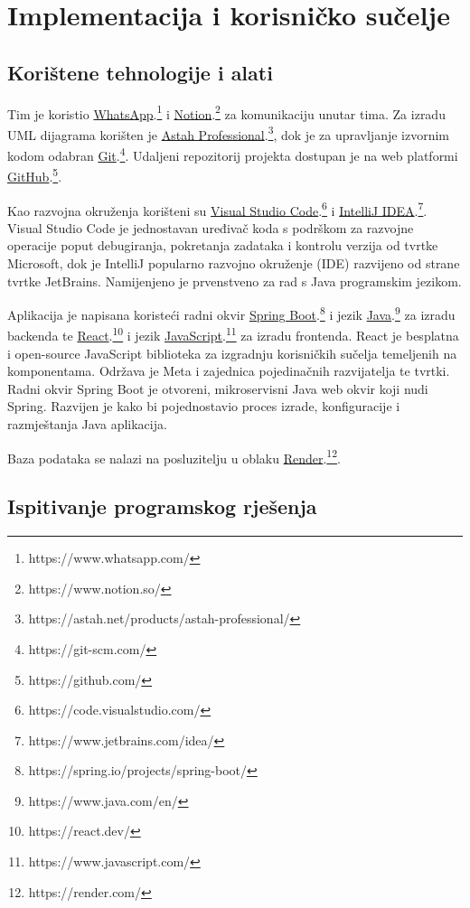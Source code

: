 \chapter{Implementacija i korisničko sučelje}
		
		
		\section{Korištene tehnologije i alati}
		
			Tim je koristio \underline{WhatsApp}.\footnote[1]{https://www.whatsapp.com/} i \underline{Notion}.\footnote[2]{https://www.notion.so/} za komunikaciju unutar tima. Za izradu UML dijagrama korišten je \underline{Astah Professional}.\footnote[3]{https://astah.net/products/astah-professional/}, dok je za upravljanje izvornim kodom odabran \underline{Git}.\footnote[4]{https://git-scm.com/}. Udaljeni repozitorij projekta dostupan je na web platformi \underline{GitHub}.\footnote[5]{https://github.com/}.
			
			Kao razvojna okruženja korišteni su \underline{Visual Studio Code}.\footnote[6]{https://code.visualstudio.com/} i \underline{IntelliJ IDEA}.\footnote[7]{https://www.jetbrains.com/idea/}. Visual Studio Code je jednostavan uređivač koda s podrškom za razvojne operacije poput debugiranja, pokretanja zadataka i kontrolu verzija od tvrtke Microsoft, dok je IntelliJ popularno razvojno okruženje (IDE) razvijeno od strane tvrtke JetBrains. Namijenjeno je prvenstveno za rad s Java programskim jezikom.
			
			Aplikacija je napisana koristeći radni okvir \underline{Spring Boot}.\footnote[8]{https://spring.io/projects/spring-boot/} i jezik \underline{Java}.\footnote[9]{https://www.java.com/en/} za izradu backenda te \underline{React}.\footnote[10]{https://react.dev/} i jezik \underline{JavaScript}.\footnote[11]{https://www.javascript.com/} za izradu frontenda. React je besplatna i open-source JavaScript biblioteka za izgradnju korisničkih sučelja temeljenih na komponentama. Održava je Meta i zajednica pojedinačnih razvijatelja te tvrtki. Radni okvir Spring Boot je otvoreni, mikroservisni Java web okvir koji nudi Spring. Razvijen je kako bi pojednostavio proces izrade, konfiguracije i razmještanja Java aplikacija. 
			
			Baza podataka se nalazi na posluzitelju u oblaku \underline{Render}.\footnote[12]{https://render.com/}.
			
			
			\eject 
		
	
		\section{Ispitivanje programskog rješenja}
			
